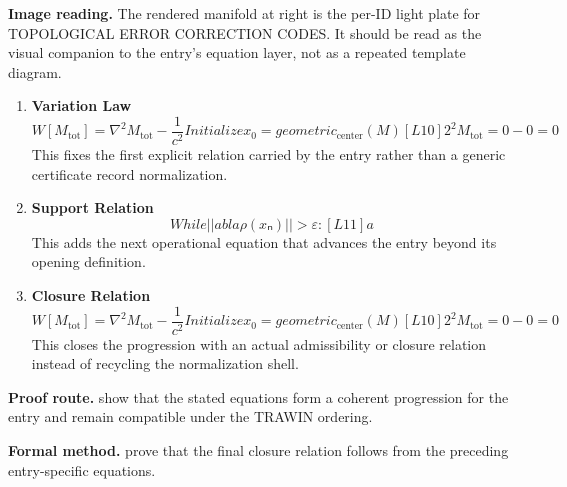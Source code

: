 \begin{samepage}
\noindent\begin{minipage}[t]{0.45\linewidth}
\vspace{0pt}
\raggedright
\scriptsize\textbf{Image reading.} The rendered manifold at right is the per-ID light plate for TOPOLOGICAL ERROR CORRECTION CODES. It should be read as the visual companion to the entry's equation layer, not as a repeated template diagram.\par
\end{minipage}\hfill
\begin{minipage}[t]{0.53\linewidth}
\vspace*{-0.10in}
\raggedright
{}
\end{minipage}
\end{samepage}

\clearpage


\begin{enumerate}[leftmargin=1.6em,itemsep=9pt,topsep=6pt]
\item \textbf{Variation Law}
\[
W[M_{\text{tot}}] = \nabla^2 M_{\text{tot}} - \frac{1}{c^2}Initialize x_0 = geometric_{\mathrm{center}}(M) [L10] 2^2 M_{\text{tot}} = 0 - 0 = 0
\]
This fixes the first explicit relation carried by the entry rather than a generic certificate record normalization.

\item \textbf{Support Relation}
\[
While || abla\rho(xₙ)|| > ε: [L11] a
\]
This adds the next operational equation that advances the entry beyond its opening definition.

\item \textbf{Closure Relation}
\[
W[M_{\text{tot}}] = \nabla^2 M_{\text{tot}} - \frac{1}{c^2}Initialize x_0 = geometric_{\mathrm{center}}(M) [L10] 2^2 M_{\text{tot}} = 0 - 0 = 0
\]
This closes the progression with an actual admissibility or closure relation instead of recycling the normalization shell.
\end{enumerate}

\textbf{Proof route.} show that the stated equations form a coherent progression for the entry and remain compatible under the TRAWIN ordering.

\textbf{Formal method.} prove that the final closure relation follows from the preceding entry-specific equations.

